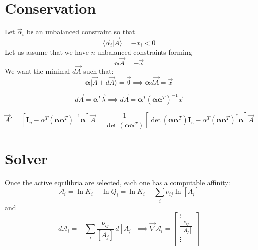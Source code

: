 \documentclass[aps,12pt]{revtex4}
\begin{document}
\section{Conservation}

Let $\vec \alpha_i$ be an unbalanced constraint so that
\begin{equation}
	\langle \vec \alpha_i \vert \vec A \rangle = - x_i < 0
\end{equation}
Let us assume that we have $n$ unbalanced constraints forming:
\begin{equation}
	\bm \alpha \vec A = - \vec x
\end{equation}
We want the minimal $d \vec A$ such that:
\begin{equation}
	\bm \alpha \vert \vec A + d \vec A \rangle = \vec 0 \implies \bm \alpha d\vec A = \vec x
\end{equation}

\begin{equation}
	d \vec A = \bm \alpha ^ T \vec \lambda \implies d \vec A = \bm \alpha^T \left(\bm \alpha \bm \alpha ^T \right) ^{-1}\vec x 
\end{equation}

\begin{equation}
	\vec{A} ' = \left[\bm I_n - \alpha^T \left(\bm \alpha \bm \alpha ^T \right)^{-1} \bm \alpha \right] \vec{A} 
	= \dfrac{1}{\det \left(\bm \alpha \bm \alpha ^T\right) } \left[\det \left(\bm \alpha \bm \alpha ^T\right)\bm I_n - \alpha^T \left(\bm \alpha \bm \alpha ^T \right)^\ast \bm \alpha \right] \vec{A}
\end{equation}
 	
\section{Solver}

Once the active equilibria are selected, each one has a computable 
affinity:
\begin{equation}
\label{eq:affinity}
	\mathcal A_i = \ln K_i - \ln Q_i = \ln K_i -  \sum_{i} \nu_{ij} \ln [A_j] %
\end{equation}
and
\begin{equation}
	d \mathcal A_i = - \sum_i \dfrac{\nu_{ij}}{[A_j]} \, d[A_j] \implies
	 \vec \nabla \mathcal A_i = 
	\begin{bmatrix}
	\vdots\\
	\frac{\nu_{ij}}{[A_j]}\\
	\vdots\\
	\end{bmatrix}
\end{equation}
\end{document}
